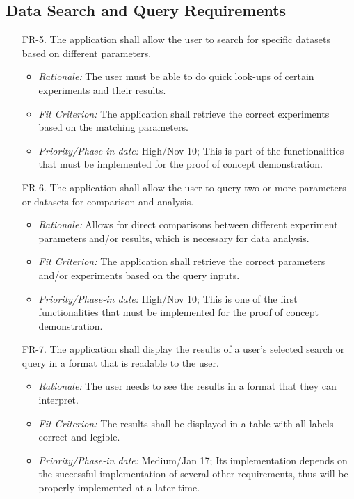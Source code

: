\documentclass[12pt]{article}
\begin{document}
\subsection{Data Search and Query Requirements}
\begin{enumerate}
  \item[FR-5.] The application shall allow the user to search for specific datasets based on different parameters.
  \begin{itemize}
    \item \textit{Rationale:} The user must be able to do quick look-ups of certain experiments and their results.
    \item \textit{Fit Criterion:} The application shall retrieve the correct experiments based on the matching parameters.
    \item \textit{Priority/Phase-in date:} High/Nov 10; This is part of the functionalities that must be implemented for the proof of concept demonstration.
  \end{itemize}
  \item[FR-6.] The application shall allow the user to query two or more parameters or datasets for comparison and analysis.
  \begin{itemize}
    \item \textit{Rationale:} Allows for direct comparisons between different experiment parameters and/or results, which is necessary for data analysis.
    \item \textit{Fit Criterion:} The application shall retrieve the correct parameters and/or experiments based on the query inputs.
    \item \textit{Priority/Phase-in date:} High/Nov 10; This is one of the first functionalities that must be implemented for the proof of concept demonstration.
  \end{itemize}
  \item[FR-7.] The application shall display the results of a user’s selected search or query in a format that is readable to the user.
  \begin{itemize}
    \item \textit{Rationale:} The user needs to see the results in a format that they can interpret.
    \item \textit{Fit Criterion:} The results shall be displayed in a table with all labels correct and legible.
    \item \textit{Priority/Phase-in date:} Medium/Jan 17; Its implementation depends on the successful implementation of several other requirements, thus will be properly implemented at a later time.
  \end{itemize}
\end{enumerate}
\end{document}
